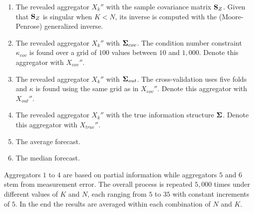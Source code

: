 \documentclass[11pt]{article}
\theoremstyle{definition}
\theoremstyle{definition}
\def\bSigma{{\bf \Sigma}}
\def\SS{{\bf S}}
\begin{document}
\begin{enumerate}
\item  The revealed aggregator  $X_k''$ with the sample covariance matrix $\SS_Z$. Given that $\SS_Z$ is singular when $K<N$, its inverse is computed with the (Moore-Penrose) generalized inverse.
\item The revealed aggregator $X_k''$ with $\bSigma_{cov}$. The condition number constraint $\kappa_{cov}$ is found over a grid of $100$ values between $10$ and $1,000$. Denote this aggregator with $X_{cov}''$. 
\item The revealed aggregator  $X_k''$ with $\bSigma_{out}$.  
The cross-validation uses five folds and $\kappa$ is found using the same grid as in $X_{cov}''$. Denote this aggregator with  $X_{out}''$. 
\item  The revealed aggregator  $X_k''$ with the true information structure $\bSigma$. Denote this aggregator with $X_{true}''$. 
\item The average forecast.
\item The median forecast.
\end{enumerate}
Aggregators $1$ to $4$ are based on partial information while aggregators $5$ and $6$ stem from measurement error. The overall process is repeated $5,000$ times under different values of $K$ and $N$, each ranging from $5$ to $35$ with constant increments of $5$. In the end the results are averaged within each combination of $N$ and $K$. 
\end{document}
